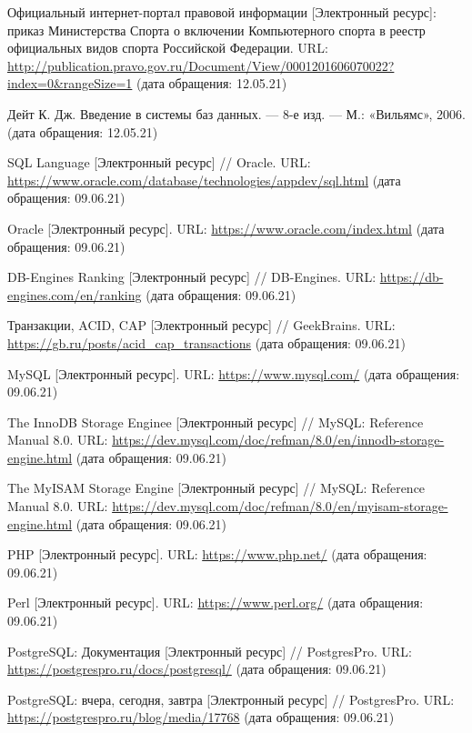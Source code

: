 
\begin{thebibliography}{1}
	Официальный интернет-портал правовой информации [Электронный ресурс]:
	приказ Министерства Спорта о включении Компьютерного спорта в реестр официальных видов спорта Российской Федерации.
	URL: \url{http://publication.pravo.gov.ru/Document/View/0001201606070022?index=0&rangeSize=1}
	(дата обращения: 12.05.21)
	
	Дейт К. Дж. Введение в системы баз данных. — 8-е изд. — М.: «Вильямс», 2006.
	(дата обращения: 12.05.21)
	
	SQL Language  [Электронный ресурс] // Oracle.
	URL: \url{https://www.oracle.com/database/technologies/appdev/sql.html}
	(дата обращения: 09.06.21)
	
	Oracle [Электронный ресурс].
	URL: \url{https://www.oracle.com/index.html}
	(дата обращения: 09.06.21)
	
	DB-Engines Ranking [Электронный ресурс] // DB-Engines.
	URL: \url{https://db-engines.com/en/ranking}
	(дата обращения: 09.06.21)
	
	Транзакции, ACID, CAP [Электронный ресурс] // GeekBrains.
	URL: \url{https://gb.ru/posts/acid_cap_transactions}
	(дата обращения: 09.06.21)
	
	MySQL [Электронный ресурс].
	URL: \url{https://www.mysql.com/}
	(дата обращения: 09.06.21)
	
	The InnoDB Storage Enginee [Электронный ресурс] // MySQL: Reference Manual 8.0.
	URL: \url{https://dev.mysql.com/doc/refman/8.0/en/innodb-storage-engine.html}
	(дата обращения: 09.06.21)
	
	The MyISAM Storage Engine [Электронный ресурс] // MySQL: Reference Manual 8.0.
	URL: \url{https://dev.mysql.com/doc/refman/8.0/en/myisam-storage-engine.html}
	(дата обращения: 09.06.21)
	
	PHP [Электронный ресурс].
	URL: \url{https://www.php.net/}
	(дата обращения: 09.06.21)
	
	Perl [Электронный ресурс].
	URL: \url{https://www.perl.org/}
	(дата обращения: 09.06.21)
	
	PostgreSQL: Документация [Электронный ресурс] // PostgresPro.
	URL: \url{https://postgrespro.ru/docs/postgresql/}
	(дата обращения: 09.06.21)
	
	PostgreSQL: вчера, сегодня, завтра [Электронный ресурс] // PostgresPro.
	URL: \url{https://postgrespro.ru/blog/media/17768}
	(дата обращения: 09.06.21)
	
\end{thebibliography}

